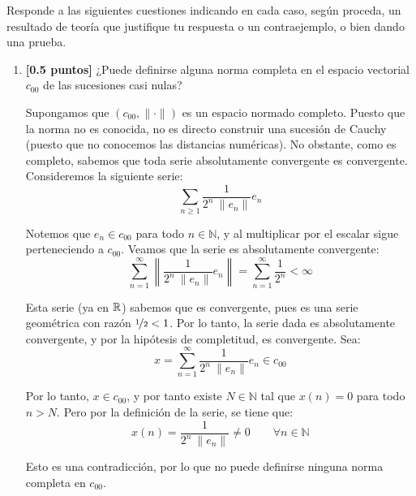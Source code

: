 \documentclass[12pt]{article}
\begin{document}
    \begin{ejercicio}[2 puntos]
        Responde a las siguientes cuestiones indicando en cada caso, según proceda, un resultado de teoría que justifique tu respuesta o un contraejemplo, o bien dando una prueba.
        \begin{enumerate}[label=\alph*)]
            \item \textbf{[0.5 puntos]} ¿Puede definirse alguna norma completa en el espacio vectorial $c_{00}$ de las sucesiones casi nulas?
            
            Supongamos que $\left(c_{00},\|\cdot\|\right)$ es un espacio normado completo. Puesto que la norma no es conocida, no es directo construir una sucesión de Cauchy (puesto que no conocemos las distancias numéricas). No obstante, como es completo, sabemos que toda serie absolutamente convergente es convergente. Consideremos la siguiente serie:
            \begin{equation*}
                \sum_{n\geq 1} \frac{1}{2^n\ \|e_n\|}e_n
            \end{equation*}

            Notemos que $e_n\in c_{00}$ para todo $n\in \mathbb{N}$, y al multiplicar por el escalar sigue perteneciendo a $c_{00}$. Veamos que la serie es absolutamente convergente:
            \begin{equation*}
                \sum_{n=1}^{\infty} \left\|\frac{1}{2^n\ \|e_n\|}e_n\right\| = \sum_{n=1}^{\infty} \frac{1}{2^n} < \infty
            \end{equation*}

            Esta serie (ya en $\mathbb{R}$) sabemos que es convergente, pues es una serie geométrica con razón $\nicefrac{1}{2}< 1$. Por lo tanto, la serie dada es absolutamente convergente, y por la hipótesis de completitud, es convergente. Sea:
            \begin{equation*}
                x = \sum_{n=1}^{\infty} \frac{1}{2^n\ \|e_n\|}e_n\in c_{00}
            \end{equation*}

            Por lo tanto, $x\in c_{00}$, y por tanto existe $N\in \mathbb{N}$ tal que $x(n) = 0$ para todo $n>N$. Pero por la definición de la serie, se tiene que:
            \begin{equation*}
                x(n) = \frac{1}{2^n\ \|e_n\|} \neq 0 \qquad \forall n\in \mathbb{N}
            \end{equation*}

            Esto es una contradicción, por lo que no puede definirse ninguna norma completa en $c_{00}$.



\end{enumerate}
\end{ejercicio}
\end{document}
